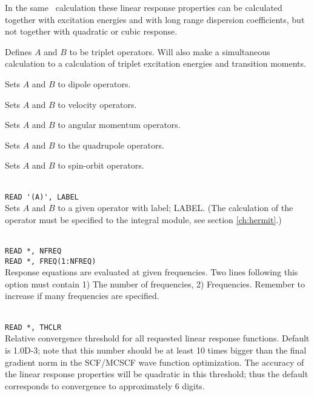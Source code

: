 In the same \resp\ calculation these linear response properties can be calculated
together with excitation energies
and with long range dispersion coefficients, but not 
together with quadratic or cubic response.

\begin{description}

\item{} Defines $A$ and $B$ to be triplet operators.
Will also make a simultaneous   calculation to
a calculation of triplet excitation energies and transition moments.

\item{}
Sets $A$ and $B$ to dipole operators.

\item{}
Sets $A$ and $B$ to velocity operators.

\item{}
Sets $A$ and $B$ to angular momentum operators.

\item{}
Sets $A$ and $B$ to the quadrupole operators.

\item{}
Sets $A$ and $B$ to spin-orbit operators.

\item{}\\
\verb|READ '(A)', LABEL|\\
Sets $A$ and $B$ to a given operator with label; LABEL.
(The calculation of the operator must be specified to the integral
module, see section \ref{ch:hermit}.)

\item{}\\
\verb|READ *, NFREQ|\\
\verb|READ *, FREQ(1:NFREQ)|\\
Response equations are evaluated at given
frequencies. Two lines following 
this option must contain 1) The number of frequencies, 2) Frequencies.
Remember to increase  if many frequencies are specified.

\item{}\\
\verb|READ *, THCLR|\\
Relative convergence threshold for all requested linear response functions.
Default is 1.0D-3; note that this number should be at least 10 times
bigger than the final gradient norm in the SCF/MCSCF
wave function optimization. The accuracy of the linear response 
properties will be quadratic in this threshold; thus the default
corresponds to convergence to approximately 6 digits.


\end{description}
